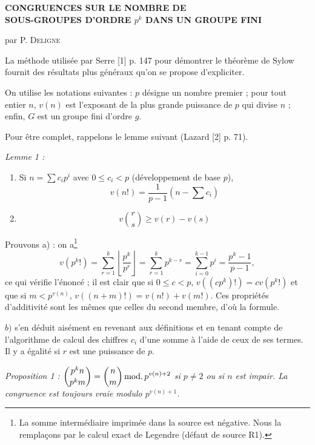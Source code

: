 \documentclass[12pt,reqno]{amsart}
\begin{document}
\pagestyle{empty}
\thispagestyle{empty}

\begin{center}
{\large\bfseries\boldmath
CONGRUENCES SUR LE NOMBRE DE\\
SOUS-GROUPES D'ORDRE $p^k$ DANS UN GROUPE FINI\par}
\vspace{1.2em}
par \textsc{P. Deligne}
\end{center}

\vspace{2em}

La méthode utilisée par Serre [1] p. 147 pour démontrer le théorème de Sylow fournit des résultats plus généraux qu'on se propose d'expliciter.

On utilise les notations suivantes : $p$ désigne un nombre premier ; pour tout entier $n$, $v(n)$ est l'exposant de la plus grande puissance de $p$ qui divise $n$ ; enfin, $G$ est un groupe fini d'ordre $g$.

Pour être complet, rappelons le lemme suivant (Lazard [2] p. 71).

\medskip
\noindent\emph{Lemme 1 :}

{\itshape
\begin{enumerate}
\item[a)] Si $n=\sum c_i p^i$ avec $0\leq c_i<p$ (développement de base $p$),
\[
v(n!)=\frac{1}{p-1}(n-\textstyle\sum c_i)
\]
\item[b)]
\[
v\binom{r}{s}\geq v(r)-v(s)
\]
\end{enumerate}
}

Prouvons a) : on a\footnote{La somme intermédiaire imprimée dans la
source est négative. Nous la remplaçons par le calcul exact de Legendre
(défaut de source R1).}
\[
v(p^k!)=\sum_{r=1}^{k}\left\lfloor\frac{p^k}{p^r}\right\rfloor
=\sum_{r=1}^{k}p^{k-r}=\sum_{i=0}^{k-1}p^i
=\frac{p^k-1}{p-1},
\]
ce qui vérifie l'énoncé ; il est clair que si $0\leq c<p$, $v((cp^k)!)=cv(p^k!)$ et que si $m<p^{v(n)}$, $v((n+m)!)=v(n!)+v(m!)$. Ces propriétés d'additivité sont les mêmes que celles du second membre, d'où la formule.

$b)$ s'en déduit aisément en revenant aux définitions et en tenant compte de l'algorithme de calcul des chiffres $c_i$ d'une somme à l'aide de ceux de ses termes. Il y a égalité si $r$ est une puissance de $p$.

\medskip
{\itshape\noindent
Proposition 1 : $\displaystyle\binom{p^k n}{p^k m}=\binom{n}{m}\mathop{\rm mod.} p^{v(n)+2}$ si $p\neq2$ ou si $n$ est impair. La congruence est toujours vraie modulo $p^{v(n)+1}$.
\par}
\end{document}
